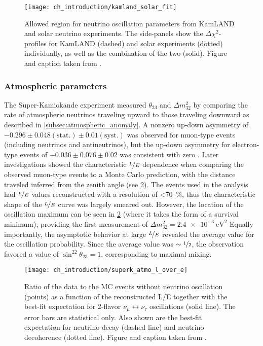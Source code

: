\begin{figure}
    \centering
    \texttt{[image: ch\_introduction/kamland\_solar\_fit]}
    \caption[Solar oscillation parameters allowed region]{
        Allowed region for neutrino oscillation parameters from KamLAND and solar
        neutrino experiments.
        The side-panels show the $\Delta \chi^2$-profiles
        for KamLAND (dashed) and solar experiments (dotted) individually,
        as well as the combination of the two (solid).
        Figure and caption taken from \cite{kamland_latest}.
    }
    \label{fig:kamland_plus_solar}
\end{figure}

\subsubsection{Atmospheric parameters}
The Super-Kamiokande experiment measured $\theta_{23}$ and $\Delta m^2_{32}$
by comparing the rate of atmospheric neutrinos
traveling upward to those traveling downward
as described in \cref{subsec:atmospheric_anomaly}.
A nonzero up-down asymmetry of $-0.296\pm0.048(\text{stat.})\pm0.01(\text{syst.})$
was observed for muon-type events (including neutrinos and antineutrinos),
but the up-down asymmetry for electron-type events
of $-0.036\pm0.076\pm0.02$ was consistent with zero \cite{superk1998}.
Later investigations \cite{superk2004} showed the characteristic $\nicefrac{L}{E}$
dependence when comparing the observed muon-type events
to a Monte Carlo prediction,
with the distance traveled inferred from the zenith angle
(see \cref{fig:superk_l_over_e}).
The events used in the analysis had $\nicefrac{L}{E}$ values reconstructed
with a resolution of \SI{<70}{\percent},
thus the characteristic shape of the $\nicefrac{L}{E}$ curve
was largely smeared out.
However, the location of the oscillation maximum
can be seen in \cref{fig:superk_l_over_e}
(where it takes the form of a survival minimum),
providing the first measurement of $\Delta m^2_{32} = \SI{2.4e-3}{\eV\squared}$
Equally importantly, the asymptotic behavior
at large $\nicefrac{L}{E}$ revealed
the average value for the oscillation probability.
Since the average value was $\sim\nicefrac{1}{2}$,
the observation favored a value of $\sin^22\theta_{23} = 1$,
corresponding to maximal mixing.

\begin{figure}
    \centering
    \texttt{[image: ch\_introduction/superk\_atmo\_l\_over\_e]}
    \caption[Super-Kamiokande atmospheric L/E distribution]{
        Ratio of the data to the MC events without neutrino oscillation (points)
        as a function of the reconstructed L/E together with
        the best-fit expectation for 2-flavor $\nu_\mu\leftrightarrow\nu_\tau$
        oscillations (solid line).
        The error bars are statistical only.
        Also shown are the best-fit expectation for neutrino decay (dashed line)
        and neutrino decoherence (dotted line).
        Figure and caption taken from \cite{superk2004}.
    }
    \label{fig:superk_l_over_e}
\end{figure}

